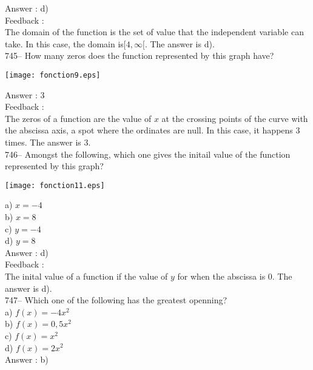 \documentclass[letterpaper, 12pt]{article}
\begin{document}
Answer : d)\\

Feedback : \\
The domain of the function is the set of value that the independent variable can take. In this case, the domain is$[4, \infty[$.  The answer is d).\\

745-- How many zeros does the function represented by this graph have?\\
    \begin{center}
    \texttt{[image: fonction9.eps]}
    \end{center}

Answer : 3\\

Feedback : \\
The zeros of a function are the value of $x$ at the crossing points of the curve with the abscissa axis, a spot where the ordinates are null.
In this case, it happens 3 times.  The answer is 3.\\

746-- Amongst the following, which one gives the initail value of the function represented by this graph?\\
    \begin{center}
    \texttt{[image: fonction11.eps]}
    \end{center}
a) $x=-4$\\
b) $x=8$\\
c) $y=-4$\\
d) $y=8$\\

Answer : d)\\

Feedback : \\
The inital value of a function if the value of $y$ for when the abscissa is 0.  The answer is d).\\

747-- Which one of the following has the greatest openning?\\
a) $f(x)=-4x^{2}$\\
b) $f(x)=0,5x^{2}$\\
c) $f(x)=x^{2}$\\
d) $f(x)=2x^{2}$\\

Answer : b)\\
\end{document}
